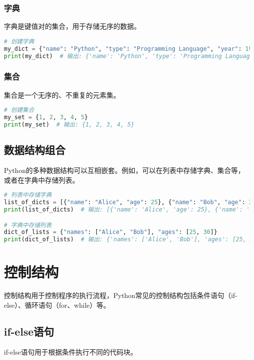 \documentclass{article}
\begin{document}
\subsubsection{字典}
字典是键值对的集合，用于存储无序的数据。

\begin{lstlisting}[language=Python,caption=字典示例]
# 创建字典
my_dict = {"name": "Python", "type": "Programming Language", "year": 1991}
print(my_dict)  # 输出: {'name': 'Python', 'type': 'Programming Language', 'year': 1991}
\end{lstlisting}

\subsubsection{集合}
集合是一个无序的、不重复的元素集。

\begin{lstlisting}[language=Python,caption=集合示例]
# 创建集合
my_set = {1, 2, 3, 4, 5}
print(my_set)  # 输出: {1, 2, 3, 4, 5}
\end{lstlisting}

\subsection{数据结构组合}
Python的多种数据结构可以互相嵌套。例如，可以在列表中存储字典、集合等，或者在字典中存储列表。

\begin{lstlisting}[language=Python,caption=数据结构组合示例]
# 列表中存储字典
list_of_dicts = [{"name": "Alice", "age": 25}, {"name": "Bob", "age": 30}]
print(list_of_dicts)  # 输出: [{'name': 'Alice', 'age': 25}, {'name': 'Bob', 'age': 30}]

# 字典中存储列表
dict_of_lists = {"names": ["Alice", "Bob"], "ages": [25, 30]}
print(dict_of_lists)  # 输出: {'names': ['Alice', 'Bob'], 'ages': [25, 30]}
\end{lstlisting}

\section{控制结构}
控制结构用于控制程序的执行流程，Python常见的控制结构包括条件语句（if-else）、循环语句（for、while）等。

\subsection{if-else语句}
if-else语句用于根据条件执行不同的代码块。
\end{document}
